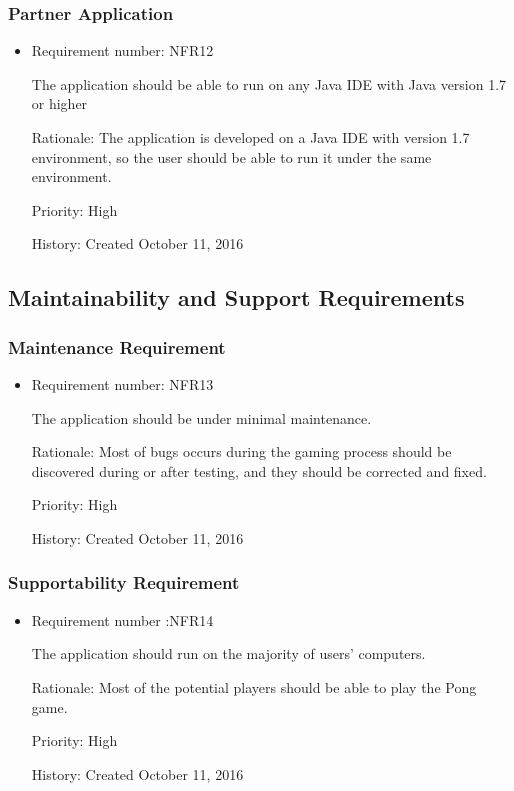 \documentclass[12pt,letterpaper]{article}
\begin{document}
\subsubsection{Partner Application}
\begin{itemize}
	\item Requirement number: NFR12

	The application should be able to run on any Java IDE with Java version 1.7 or higher

	Rationale: The application is developed on a Java IDE with version 1.7 environment, so the user should be able to run it under the same environment. 

	Priority: High

	History: Created October 11, 2016
\end{itemize}
\subsection{Maintainability and Support Requirements}
\subsubsection{Maintenance Requirement}
\begin{itemize}
	\item Requirement number: NFR13

	The application should be under minimal maintenance.

	Rationale: Most of bugs occurs during the gaming process should be discovered during or after testing, and they should be corrected and fixed.

	Priority: High

	History: Created October 11, 2016
\end{itemize}
\subsubsection{Supportability Requirement}
\begin{itemize}
	\item Requirement number :NFR14
	
	 The application should run on the majority of users’ computers.

	Rationale: Most of the potential players should be able to play the Pong game. 
	
	Priority: High    

	History: Created October 11, 2016    
\end{itemize}
\end{document}

